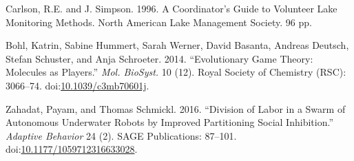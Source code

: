 \documentclass[]{article}
\begin{document}
Carlson, R.E. and J. Simpson. 1996. A Coordinator's Guide to Volunteer
Lake Monitoring Methods. North American Lake Management Society. 96 pp.

\hypertarget{refs}{}
\hypertarget{ref-Bohl_2014}{}
Bohl, Katrin, Sabine Hummert, Sarah Werner, David Basanta, Andreas
Deutsch, Stefan Schuster, and Anja Schroeter. 2014. ``Evolutionary Game
Theory: Molecules as Players.'' \emph{Mol. BioSyst.} 10 (12). Royal
Society of Chemistry (RSC): 3066--74.
doi:\href{https://doi.org/10.1039/c3mb70601j}{10.1039/c3mb70601j}.

\hypertarget{ref-Zahadat_2016}{}
Zahadat, Payam, and Thomas Schmickl. 2016. ``Division of Labor in a
Swarm of Autonomous Underwater Robots by Improved Partitioning Social
Inhibition.'' \emph{Adaptive Behavior} 24 (2). SAGE Publications:
87--101.
doi:\href{https://doi.org/10.1177/1059712316633028}{10.1177/1059712316633028}.
\end{document}
